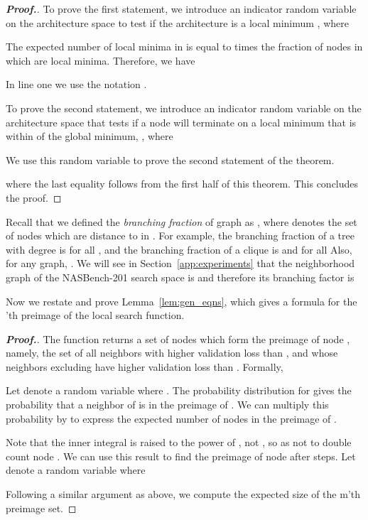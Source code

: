 \documentclass[11pt]{article}
\numberwithin{equation}{section}
\numberwithin{figure}{section}
\theoremstyle{plain}
\theoremstyle{definition}
\begin{document}
\begin{proof}[\textbf{Proof.}]
To prove the first statement,
we introduce an indicator random variable on the architecture space to test if the architecture is a local minimum ,
where 



The expected number of local minima in  is equal to  times the
fraction of nodes in  which are local minima. Therefore, we have



In line one we use the notation .


To prove the second statement, we introduce an indicator random variable on the architecture space that tests if a node will terminate on a local minimum that is
within  of the global minimum, , where



We use this random variable to prove the second statement of the theorem.



where the last equality follows from the first half of this theorem.
This concludes the proof.
\end{proof}


Recall that we defined the \emph{branching fraction} of graph  as ,
where  denotes the set of nodes which are distance  to  in .
For example, the branching fraction of a tree with degree  is  for all ,
and the branching fraction of a clique is  and  for all 
Also, for any graph, .
We will see in Section~\ref{app:experiments} that the neighborhood graph of 
the NASBench-201 search space is  and therefore its branching factor 
is 

Now we restate and prove Lemma~\ref{lem:gen_eqns}, which
gives a formula for the 'th preimage of the local search function.

\geneqns*

\begin{proof}[\textbf{Proof.}]
The function  returns a set of nodes which form the 
preimage of node , namely, the set of all neighbors  
with higher validation loss than , and whose neighbors  excluding  
have higher validation loss than . Formally,


Let  denote a random variable where . The probability distribution for  gives 
the probability that a neighbor of  is in the preimage of . 
We can multiply this probability by  to express the expected number of nodes in the preimage of .




Note that the inner integral is raised to the power of , not ,
so as not to double count node .
We can use this result to find the preimage of node  after  steps. Let  denote a random variable where




Following a similar argument as above, we 
compute the expected size of the m'th preimage set.


\end{proof}
\end{document}
